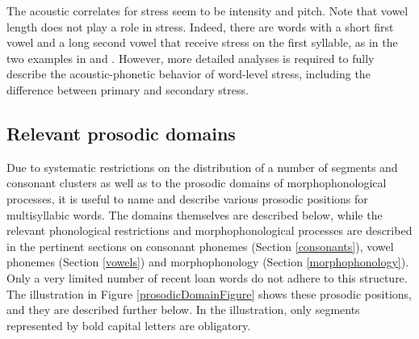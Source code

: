 The acoustic correlates for stress seem to be intensity and pitch. 
Note that vowel length does not play a role in stress. Indeed, there are words with a short first vowel and a long second vowel that receive stress on the first syllable, as in the two examples in  and .
However, more detailed analyses is required to fully describe the acous\-tic\--pho\-ne\-tic behavior of word-level stress, including the difference between primary and secondary stress. 


\subsection{Relevant prosodic domains}\label{prosodicDomains}
Due to systematic restrictions on the distribution of a number of segments and consonant clusters as well as to the prosodic domains of morphophonological processes, it is useful to name and describe various prosodic positions for multisyllabic words. The domains themselves are described below, while the relevant phonological restrictions and morphophonological processes are described in the pertinent sections on consonant phonemes (Section \ref{consonants}), vowel phonemes (Section \ref{vowels}) and morphophonology (Section \ref{morphophonology}). Only a very limited number of recent loan words do not adhere to this structure. 
The illustration in Figure \vref{prosodicDomainFigure} shows these prosodic positions, and they are described further below. In the illustration, only segments represented by bold capital letters are obligatory.
\newcommand{\Cyes}{{\fontspec{Arial}\Bf{C}}}
\newcommand{\Cno}{{\fontspec{Arial}c}}
\newcommand{\Vyes}{{\fontspec{Arial}\Bf{V}}}
\newcommand{\Vno}{{\fontspec{Arial}v}}
